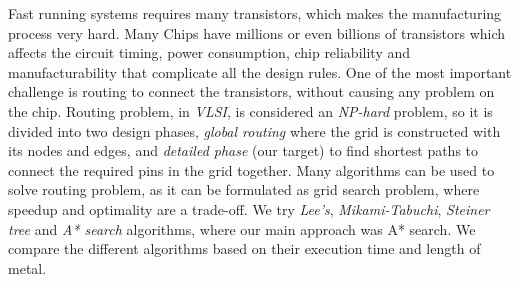 Fast running systems requires many transistors, which makes the manufacturing process very hard.
Many Chips have millions or even billions of transistors which affects the circuit timing, power consumption, chip reliability and manufacturability that complicate all the design rules.
One of the most important challenge is routing to connect the transistors, without causing any problem on the chip.
Routing problem, in \emph{VLSI}, is considered an \emph{NP-hard} problem, so it is divided into two design phases, \emph{global routing} where the grid is constructed with its nodes and edges,
and \emph{detailed phase} (our target) to find shortest paths to connect the required pins in the grid together.
Many algorithms can be used to solve routing problem, as it can be formulated as grid search problem, where speedup and optimality are a trade-off.
We try \emph{Lee's}, \emph{Mikami-Tabuchi}, \emph{Steiner tree} and \emph{A* search} algorithms, where our main approach was A* search.
We compare the different algorithms based on their execution time and length of metal.